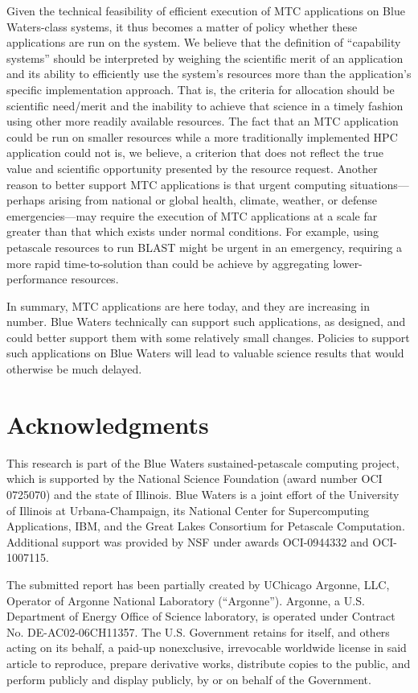 \documentclass[10pt,letterpaper]{article}
\begin{document}
Given the technical feasibility of efficient execution of MTC applications on Blue 
Waters-class systems, it thus becomes a matter of policy whether these applications 
are run on the system. We believe that the definition of ``capability systems'' should be 
interpreted by weighing the scientific merit of an application and its 
ability to efficiently use the system's resources more than the application's
specific implementation 
approach. That is, the criteria for allocation should be scientific need/merit 
and the inability to achieve that science in a timely fashion using other more readily 
available resources. The fact that an MTC application could be run on smaller 
resources while a more traditionally implemented HPC application could not is, we 
believe, a criterion that does not reflect the true value and scientific opportunity 
presented by the resource request. Another reason to better support MTC 
applications is that urgent computing situations---perhaps arising from national or global 
health, climate, weather, or defense emergencies---may require the execution of MTC 
applications at a scale far greater than that which exists under normal conditions. For 
example, using petascale resources to run BLAST might be urgent in an emergency, 
requiring a more rapid time-to-solution than could be achieve by aggregating
lower-performance resources.

In summary, MTC applications are here today, and they are increasing in number.
Blue Waters technically
can support such applications, as designed, and could better support them with some
relatively small changes.  Policies to support such applications on Blue Waters
will lead to valuable science results that would otherwise be much delayed.


\section*{Acknowledgments}

This research is part of the Blue Waters sustained-petascale computing project, which is supported by the National Science Foundation (award number OCI 0725070) and the state of Illinois. Blue Waters is a joint effort of the University of Illinois at Urbana-Champaign, its National Center for Supercomputing Applications, IBM, and the Great Lakes Consortium for Petascale Computation.
Additional support was provided by NSF under awards OCI-0944332 and OCI-1007115. 





The submitted report has been partially created by UChicago Argonne, LLC, Operator of Argonne National Laboratory (``Argonne''). Argonne, a U.S. Department of Energy Office of Science laboratory, is operated under Contract No. DE-AC02-06CH11357. The U.S. Government retains for itself, and others acting on its behalf, a paid-up nonexclusive, irrevocable worldwide license in said article to reproduce, prepare derivative works, distribute copies to the public, and perform publicly and display publicly, by or on behalf of the Government.
\end{document}
